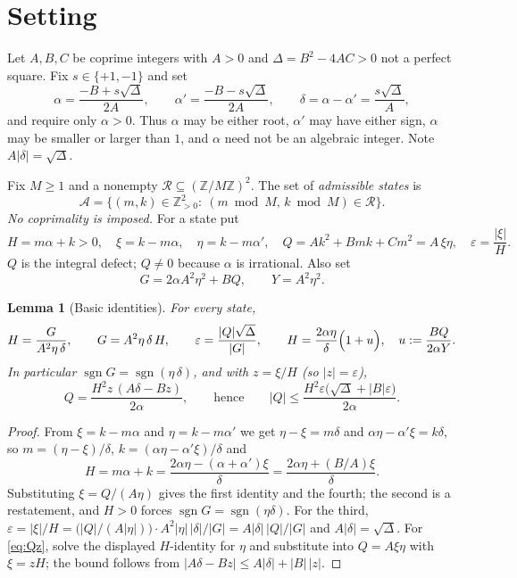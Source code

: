 \documentclass[11pt]{article}
\newtheorem{lemma}[theorem]{Lemma}
\theoremstyle{definition}
\theoremstyle{remark}
\newcommand{\Z}{\mathbb{Z}}
\newcommand{\adm}{\mathcal{A}}
\newcommand{\dd}{\delta}
\newcommand{\sgn}{\operatorname{sgn}}
\begin{document}
\section{Setting}\label{sec:setting}

Let $A,B,C$ be coprime integers with $A>0$ and $\Delta=B^2-4AC>0$ not a perfect square. Fix
$s\in\{+1,-1\}$ and set
\[
\alpha=\frac{-B+s\sqrt\Delta}{2A},\qquad
\alpha'=\frac{-B-s\sqrt\Delta}{2A},\qquad
\dd=\alpha-\alpha'=\frac{s\sqrt\Delta}{A},
\]
and require only $\alpha>0$. Thus $\alpha$ may be either root, $\alpha'$ may have either sign,
$\alpha$ may be smaller or larger than $1$, and $\alpha$ need not be an algebraic integer. Note
$A|\dd|=\sqrt\Delta$.

Fix $M\ge1$ and a nonempty $\mathcal R\subseteq(\Z/M\Z)^2$. The set of \emph{admissible states}
is
\[
\adm=\bigl\{(m,k)\in\Z_{>0}^2:\ (m\bmod M,\,k\bmod M)\in\mathcal R\bigr\}.
\]
\emph{No coprimality is imposed.} For a state put
\[
H=m\alpha+k>0,\quad
\xi=k-m\alpha,\quad
\eta=k-m\alpha',\quad
Q=Ak^2+Bmk+Cm^2=A\,\xi\eta,\quad
\varepsilon=\frac{|\xi|}{H}.
\]
$Q$ is the integral defect; $Q\ne0$ because $\alpha$ is irrational. Also set
\[
G=2\alpha A^2\eta^2+BQ,\qquad Y=A^2\eta^2 .
\]

\begin{lemma}[Basic identities]\label{lem:ident}
For every state,
\begin{equation}\label{eq:ident}
H=\frac{G}{A^2\eta\,\dd},\qquad
G=A^2\eta\,\dd\,H,\qquad
\varepsilon=\frac{|Q|\sqrt\Delta}{|G|},\qquad
H=\frac{2\alpha\eta}{\dd}\Bigl(1+u\Bigr),\quad u:=\frac{BQ}{2\alpha Y}.
\end{equation}
In particular $\sgn G=\sgn(\eta\,\dd)$, and with $z=\xi/H$ (so $|z|=\varepsilon$),
\begin{equation}\label{eq:Qz}
Q=\frac{H^2z\,(A\dd-Bz)}{2\alpha},\qquad\text{hence}\qquad
|Q|\le\frac{H^2\varepsilon\bigl(\sqrt\Delta+|B|\varepsilon\bigr)}{2\alpha}.
\end{equation}
\end{lemma}

\begin{proof}
From $\xi=k-m\alpha$ and $\eta=k-m\alpha'$ we get $\eta-\xi=m\dd$ and
$\alpha\eta-\alpha'\xi=k\dd$, so $m=(\eta-\xi)/\dd$, $k=(\alpha\eta-\alpha'\xi)/\dd$ and
\[
H=m\alpha+k=\frac{2\alpha\eta-(\alpha+\alpha')\xi}{\dd}
 =\frac{2\alpha\eta+(B/A)\xi}{\dd}.
\]
Substituting $\xi=Q/(A\eta)$ gives the first identity and the fourth; the second is a
restatement, and $H>0$ forces $\sgn G=\sgn(\eta\dd)$. For the third,
$\varepsilon=|\xi|/H=\bigl(|Q|/(A|\eta|)\bigr)\cdot A^2|\eta|\,|\dd|/|G|=A|\dd|\,|Q|/|G|$ and
$A|\dd|=\sqrt\Delta$. For \eqref{eq:Qz}, solve the displayed $H$-identity for $\eta$ and
substitute into $Q=A\xi\eta$ with $\xi=zH$; the bound follows from
$|A\dd-Bz|\le A|\dd|+|B|\,|z|$.
\end{proof}
\end{document}
